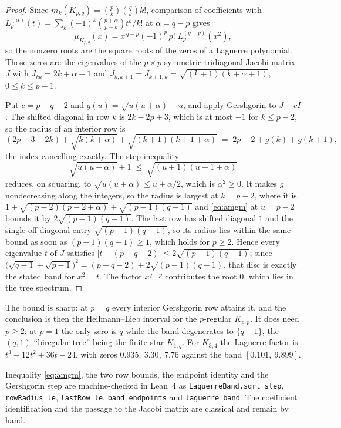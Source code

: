 \documentclass[11pt]{article}
\theoremstyle{remark}
\begin{document}
\begin{proof}
Since $m_k(K_{p,q})=\binom pk\binom qk k!$, comparison of coefficients with
$L_p^{(\alpha)}(t)=\sum_k(-1)^k\binom{p+\alpha}{p-k}t^k/k!$ at $\alpha=q-p$ gives
\[
\mu_{K_{p,q}}(x)=x^{\,q-p}(-1)^p\,p!\;L_p^{(q-p)}(x^2),
\]
so the nonzero roots are the square roots of the zeros of a Laguerre polynomial.
Those zeros are the eigenvalues of the $p\times p$ symmetric tridiagonal Jacobi
matrix $J$ with $J_{kk}=2k+\alpha+1$ and $J_{k,k+1}=J_{k+1,k}=\sqrt{(k+1)(k+\alpha+1)}$,
$0\le k\le p-1$.

Put $c=p+q-2$ and $g(u)=\sqrt{u(u+\alpha)}-u$, and apply Gershgorin to $J-cI$. The
shifted diagonal in row $k$ is $2k-2p+3$, which is at most $-1$ for $k\le p-2$, so
the radius of an interior row is
\[
(2p-3-2k)+\sqrt{k(k+\alpha)}+\sqrt{(k+1)(k+1+\alpha)}\;=\;2p-2+g(k)+g(k+1),
\]
the index cancelling exactly. The step inequality
\begin{equation}\label{eq:amgm}
\sqrt{u(u+\alpha)}+1\;\le\;\sqrt{(u+1)(u+1+\alpha)}
\end{equation}
reduces, on squaring, to $\sqrt{u(u+\alpha)}\le u+\alpha/2$, which is
$\alpha^2\ge0$. It makes $g$ nondecreasing along the integers, so the radius is
largest at $k=p-2$, where it is $1+\sqrt{(p-2)(p-2+\alpha)}+\sqrt{(p-1)(q-1)}$ and
\eqref{eq:amgm} at $u=p-2$ bounds it by $2\sqrt{(p-1)(q-1)}$. The last row has
shifted diagonal $1$ and the single off-diagonal entry $\sqrt{(p-1)(q-1)}$, so its
radius lies within the same bound as soon as $(p-1)(q-1)\ge1$, which holds for
$p\ge2$. Hence every eigenvalue $t$ of $J$ satisfies
$|t-(p+q-2)|\le2\sqrt{(p-1)(q-1)}$; since
$\bigl(\sqrt{q-1}\pm\sqrt{p-1}\bigr)^2=(p+q-2)\pm2\sqrt{(p-1)(q-1)}$, that disc is
exactly the stated band for $x^2=t$. The factor $x^{q-p}$ contributes the root $0$,
which lies in the tree spectrum.
\end{proof}

The bound is sharp: at $p=q$ every interior Gershgorin row attains it, and the
conclusion is then the Heilmann--Lieb interval for the $p$-regular $K_{p,p}$. It
does need $p\ge2$: at $p=1$ the only zero is $q$ while the band degenerates to
$\{q-1\}$, the $(q,1)$-``biregular tree'' being the finite star $K_{1,q}$. For
$K_{3,4}$ the Laguerre factor is $t^3-12t^2+36t-24$, with zeros
$0.935,\ 3.30,\ 7.76$ against the band $[0.101,\ 9.899]$.

Inequality \eqref{eq:amgm}, the two row bounds, the endpoint identity and the
Gershgorin step are machine-checked in Lean~4 as \texttt{LaguerreBand.sqrt\_step},
\texttt{rowRadius\_le}, \texttt{lastRow\_le}, \texttt{band\_endpoints} and
\texttt{laguerre\_band}. The coefficient identification and the passage to the Jacobi
matrix are classical and remain by hand.
\end{document}
